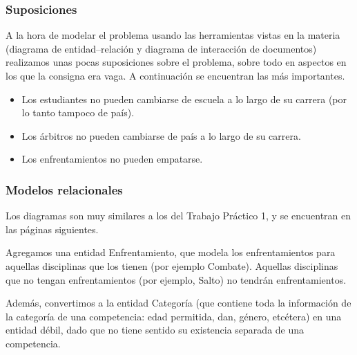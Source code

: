 
\subsubsection{Suposiciones}
A la hora de modelar el problema usando las herramientas vistas en la materia (diagrama de entidad--relación y diagrama de interacción de documentos)
realizamos unas pocas suposiciones sobre el problema, sobre todo en aspectos en los que la consigna era vaga. A continuación se encuentran las más importantes.

\begin{itemize}
\item Los estudiantes no pueden cambiarse de escuela a lo largo de su carrera (por lo tanto tampoco de país).
\item Los árbitros no pueden cambiarse de país a lo largo de su carrera.
\item Los enfrentamientos no pueden empatarse.
\end{itemize}

\subsubsection{Modelos relacionales}
Los diagramas son muy similares a los del Trabajo Práctico 1, y se encuentran en las páginas siguientes.

Agregamos una entidad Enfrentamiento, que modela los enfrentamientos para aquellas disciplinas que los tienen (por ejemplo Combate). Aquellas disciplinas que no tengan enfrentamientos (por ejemplo, Salto) no tendrán enfrentamientos.

Además, convertimos a la entidad Categoría (que contiene toda la información de la categoría de una competencia: edad permitida, dan, género, etcétera) en una entidad débil, dado que no tiene sentido su existencia separada de una competencia.

\newpage

